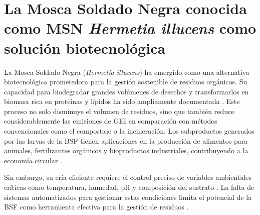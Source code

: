 \section{La Mosca Soldado Negra conocida como MSN \textit{Hermetia illucens}  como solución biotecnológica}

La Mosca Soldado Negra (\textit{Hermetia illucens}) ha emergido como una alternativa biotecnológica prometedora para la gestión sostenible de residuos orgánicos. Su capacidad para biodegradar grandes volúmenes de desechos y transformarlos en biomasa rica en proteínas y lípidos ha sido ampliamente documentada \parencite{barragan2017nutritional}. Este proceso no solo disminuye el volumen de residuos, sino que también reduce considerablemente las emisiones de GEI en comparación con métodos convencionales como el compostaje o la incineración. Los subproductos generados por las larvas de la BSF tienen aplicaciones en la producción de alimentos para animales, fertilizantes orgánicos y bioproductos industriales, contribuyendo a la economía circular \parencite{Diener2011,Salam2022,brunoValorizationOrganicWaste2025,koyunogluBiofuelProductionUtilizing2024,suryatiLauricAcidBlack2023,siddiquiEnhancingBioconversionRate2024,hamamAdvancesInsectIndustry2024,sarangiFoodWasteFood2024}.

Sin embargo, su cría eficiente requiere el control preciso de variables ambientales críticas como temperatura, humedad, pH y composición del sustrato \parencite{Salam2022,belperioAssessingSubstrateUtilization2024,nayakHermetiaIllucensDiptera2024,goldEffectsRearingSystem2022,Chia2019}. La falta de sistemas automatizados para gestionar estas condiciones limita el potencial de la BSF como herramienta efectiva para la gestión de residuos \parencite{surendraRethinkingOrganicWastes2020a}.